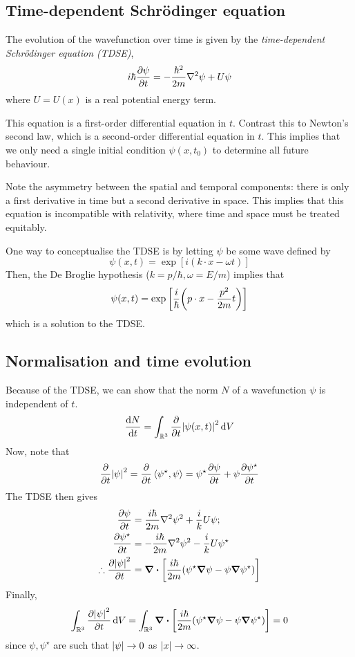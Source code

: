 \subsection{Time-dependent Schr\"odinger equation}
\begin{definition}
	The evolution of the wavefunction over time is given by the \textit{time-dependent Schr\"odinger equation (TDSE)},
	\[
		i\hbar \pdv{\psi}{t} = -\frac{\hbar^2}{2m} \laplacian \psi + U \psi
	\]
	where \( U = U(x) \) is a real potential energy term.
\end{definition}
\begin{remark}
	This equation is a first-order differential equation in \( t \).
	Contrast this to Newton's second law, which is a second-order differential equation in \( t \).
	This implies that we only need a single initial condition \( \psi(x,t_0) \) to determine all future behaviour.
\end{remark}
\begin{remark}
	Note the asymmetry between the spatial and temporal components: there is only a first derivative in time but a second derivative in space.
	This implies that this equation is incompatible with relativity, where time and space must be treated equitably.
\end{remark}
One way to conceptualise the TDSE is by letting \( \psi \) be some wave defined by
\[
	\psi(x,t) = \exp[ i(k \cdot x - \omega t) ]
\]
Then, the De Broglie hypothesis (\( k = p/\hbar, \omega = E/m \)) implies that
\[
	\psi(x,t) = \exp\qty[\frac{i}{\hbar}\qty(p \cdot x - \frac{p^2}{2m}t)]
\]
which is a solution to the TDSE.\@

\subsection{Normalisation and time evolution}
Because of the TDSE, we can show that the norm \( N \) of a wavefunction \( \psi \) is independent of \( t \).
\[
	\dv{N}{t} = \int_{\mathbb R^3} \pdv{t} \abs{\psi(x,t)}^2 \dd{V}
\]
Now, note that
\[
	\pdv{t} \abs{\psi}^2 = \pdv{t} \left\langle{\psi^\star, \psi}\right\rangle = \psi^\star \pdv{\psi}{t} + \psi \pdv{\psi^\star}{t}
\]
The TDSE then gives
\begin{align*}
	\pdv{\psi}{t}                    & = \frac{i \hbar}{2m} \laplacian \psi^2 + \frac{i}{k} U \psi;                   \\
	\pdv{\psi^\star}{t}              & = - \frac{i \hbar}{2m} \laplacian \psi^2 - \frac{i}{k} U \psi^\star            \\
	\therefore \pdv{\abs{\psi}^2}{t} & = \div[\frac{i\hbar}{2m}\qty(\psi^\star \grad{\psi} - \psi \grad{\psi^\star})]
\end{align*}
Finally,
\[
	\int_{\mathbb R^3} \pdv{\abs{\psi}^2}{t} \dd{V} = \int_{\mathbb R^3} \div[ \frac{i\hbar}{2m}\qty(\psi^\star \grad{\psi} - \psi \grad{\psi^\star}) ] = 0
\]
since \( \psi, \psi^\star \) are such that \( \abs{\psi} \to 0 \) as \( \abs{x} \to \infty \).

